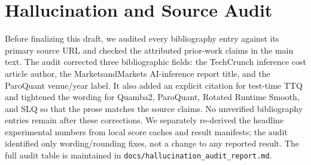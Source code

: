 \documentclass{article}
\begin{document}
\begin{table}[h]
\centering
\small
{}
\caption{Layer-type decomposition. Strict set-leaving is the component most directly relevant to protected-set membership; within-set shuffling motivates scale-refresh mechanisms but is not itself membership loss.}
\end{table}

\section{Hallucination and Source Audit}
\label{app:hallucination-audit}

Before finalizing this draft, we audited every bibliography entry against its
primary source URL and checked the attributed prior-work claims in the main
text. The audit corrected three bibliographic fields: the TechCrunch inference
cost article author, the MarketsandMarkets AI-inference report title, and the
ParoQuant venue/year label. It also added an explicit citation for test-time
TTQ and tightened the wording for Quamba2, ParoQuant, Rotated Runtime Smooth,
and SLQ so that the prose matches the source claims. No unverified bibliography
entries remain after these corrections. We separately re-derived the headline
experimental numbers from local score caches and result manifests; the audit
identified only wording/rounding fixes, not a change to any reported result.
The full audit table is maintained in \texttt{docs/hallucination\_audit\_report.md}.
\end{document}
